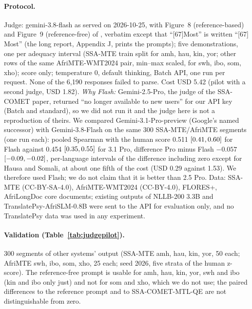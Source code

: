 \paragraph{Protocol.} Judge: gemini-3.8-flash as served on 2026-10-25, with Figure~8 (reference-based) and Figure~9 (reference-free) of \citet{li2025ssacomet}, verbatim except that ``[67]Most'' is written ``[67] Most'' (the long report, Appendix J, prints the prompts); five demonstrations, one per adequacy interval (SSA-MTE train split for amh, hau, kin, yor; other rows of the same AfriMTE-WMT2024 pair, min--max scaled, for swh, ibo, som, xho); score only; temperature 0, default thinking, Batch API, one run per request. None of the 6,190 responses failed to parse. Cost USD 5.42 (pilot with a second judge, USD 1.82). \emph{Why Flash:} Gemini-2.5-Pro, the judge of the SSA-COMET paper, returned ``no longer available to new users'' for our API key (Batch and standard), so we did not run it and the judge here is not a reproduction of theirs. We compared Gemini-3.1-Pro-preview (Google's named successor) with Gemini-3.8-Flash on the same 300 SSA-MTE/AfriMTE segments (one run each): pooled Spearman with the human score 0.511 $[0.41, 0.60]$ for Flash against 0.454 $[0.35, 0.55]$ for 3.1 Pro, difference Pro minus Flash $-0.057$ $[-0.09, -0.02]$, per-language intervals of the difference including zero except for Hausa and Somali, at about one fifth of the cost (USD 0.29 against 1.53). We therefore used Flash; we do not claim that it is better than 2.5 Pro. Data: SSA-MTE (CC-BY-SA-4.0), AfriMTE-WMT2024 (CC-BY-4.0), FLORES+, AfriLongDoc core documents; existing outputs of NLLB-200 3.3B and TranslatePsy-AfriSLM-0.8B were sent to the API for evaluation only, and no TranslatePsy data was used in any experiment.
\paragraph{Validation (Table~\ref{tab:judgepilot}).} 300 segments of other systems' output (SSA-MTE amh, hau, kin, yor, 50 each; AfriMTE swh, ibo, som, xho, 25 each; seed 2026, five strata of the human z-score). The reference-free prompt is usable for amh, hau, kin, yor, swh and ibo (kin and ibo only just) and not for som and xho, which we do not use; the paired differences to the reference prompt and to SSA-COMET-MTL-QE are not distinguishable from zero.

